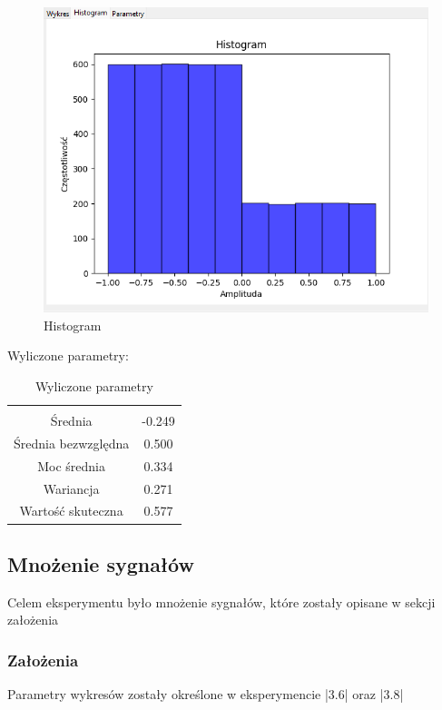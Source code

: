 \documentclass{article}
\begin{document}
\begin{figure}[h!]
    \centering
    \includegraphics[width=\textwidth]{img/sub/hist.png}
    \caption{Histogram}
\end{figure}
\FloatBarrier
Wyliczone parametry:
\begin{table}[h!]
    \centering
    \vspace{0.2cm}
    \begin{tabular}{|c|c|}
        \hline\hline\\[-0.4cm]
        Średnia & -0.249  \\
        \hline
        Średnia bezwzględna & 0.500  \\
        \hline
        Moc średnia & 0.334  \\
        \hline
        Wariancja & 0.271 \\
        \hline
        Wartość skuteczna & 0.577 \\
        \hline
    \end{tabular}
    \caption{Wyliczone parametry}
    \label{sub}
\end{table} 

\subsection{Mnożenie sygnałów} \label{mul} 
Celem eksperymentu było mnożenie sygnałów, które zostały opisane w sekcji założenia

\subsubsection{Założenia} 
    Parametry wykresów zostały określone w eksperymencie |3.6| oraz |3.8|
\end{document}
